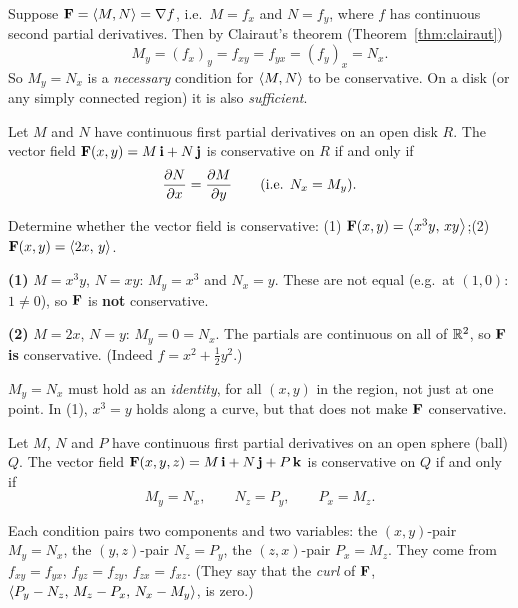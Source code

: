 Suppose $\mathbf{F}=\left\langle M,N \right\rangle=\nabla f$, i.e.\ $M=f_x$ and $N=f_y$, where $f$ has
continuous second partial derivatives. Then by Clairaut's theorem
(Theorem~\ref{thm:clairaut})
\[
  M_y=(f_x)_y=f_{xy}=f_{yx}=(f_y)_x=N_x .
\]
So $M_y=N_x$ is a \emph{necessary} condition for $\left\langle M,N \right\rangle$ to be conservative.
On a disk (or any simply connected region) it is also \emph{sufficient}.

\begin{theorem}\label{thm:test2}
Let $M$ and $N$ have continuous first partial derivatives on an open disk $R$.
The vector field $\mathbf{F}(x,y)=M\,\mathbf{i}+N\,\mathbf{j}$ is conservative on $R$ if and only if
\[
  \frac{\partial N}{\partial x}=\frac{\partial M}{\partial y}\qquad(\text{i.e. } N_x=M_y).
\]
\end{theorem}

\begin{example}\label{ex:7.4}
Determine whether the vector field is conservative:
(1) $\mathbf{F}(x,y)=\left\langle x^3y,\,xy \right\rangle$;\quad (2) $\mathbf{F}(x,y)=\left\langle 2x,\,y \right\rangle$.
\end{example}
\begin{solution}
\textbf{(1)} $M=x^3y$, $N=xy$: $M_y=x^3$ and $N_x=y$. These are not equal (e.g.\ at
$(1,0)$: $1\neq0$), so $\mathbf{F}$ is \textbf{not} conservative.

\textbf{(2)} $M=2x$, $N=y$: $M_y=0=N_x$. The partials are continuous on all of
$\mathbb{R}^2$, so $\mathbf{F}$ \textbf{is} conservative. (Indeed $f=x^2+\frac12y^2$.)
\end{solution}

\begin{warning}
$M_y=N_x$ must hold as an \emph{identity}, for all $(x,y)$ in the region, not
just at one point. In (1), $x^3=y$ holds along a curve, but that does not
make $\mathbf{F}$ conservative.
\end{warning}

\begin{theorem}\label{thm:test3}
Let $M$, $N$ and $P$ have continuous first partial derivatives on an open
sphere (ball) $Q$. The vector field $\mathbf{F}(x,y,z)=M\,\mathbf{i}+N\,\mathbf{j}+P\,\mathbf{k}$ is
conservative on $Q$ if and only if
\[
  M_y=N_x,\qquad N_z=P_y,\qquad P_x=M_z .
\]
\end{theorem}

\begin{remark}
Each condition pairs two components and two variables: the
$(x,y)$-pair $M_y=N_x$, the $(y,z)$-pair $N_z=P_y$, the $(z,x)$-pair $P_x=M_z$.
They come from $f_{xy}=f_{yx}$, $f_{yz}=f_{zy}$, $f_{zx}=f_{xz}$. (They say that
the \emph{curl} of $\mathbf{F}$, $\left\langle P_y-N_z,\,M_z-P_x,\,N_x-M_y \right\rangle$, is zero.)
\end{remark}

